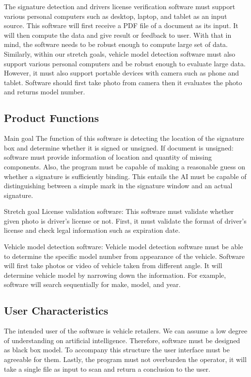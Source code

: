 \documentclass[onecolumn, draftclsnofoot,10pt, compsoc]{IEEEtran}
\begin{document}
The signature detection and drivers license verification software must support various personal computers such as desktop, laptop, and tablet as an input source. This software will first receive a PDF file of a document as its input. It will then compute the data and give result or feedback to user. With that in mind, the software needs to be robust enough to compute large set of data. Similarly, within our stretch goals, vehicle model detection software must also support various personal computers and be robust enough to evaluate large data. However, it must also support portable devices with camera such as phone and tablet. Software should first take photo from camera then it evaluates the photo and returns model number.

\subsection{Product Functions}
Main goal
The function of this software is detecting the location of the signature box and determine whether it is signed or unsigned. If document is unsigned: software must provide information of location and quantity of missing components. Also, the program must be capable of making a reasonable guess on whether a signature is sufficiently binding. This entails the AI must be capable of distinguishing between a simple mark in the signature window and an actual signature.

Stretch goal
License validation software: This software must validate whether given photo is driver’s license or not. First, it must validate the format of driver’s license and check legal information such as expiration date.

Vehicle model detection software: Vehicle model detection software must be able to determine the specific model number from appearance of the vehicle. Software will first take photos or video of vehicle taken from different angle. It will determine vehicle model by narrowing down the information. For example, software will search sequentially for make, model, and year.

\subsection{User Characteristics}
The intended user of the software is vehicle retailers. We can assume a low degree of understanding on artificial intelligence. Therefore, software must be designed as black box model. To accompany this structure the user interface must be agreeable for them. Lastly, the program must not overburden the operator, it will take a single file as input to scan and return a conclusion to the user.
\end{document}
